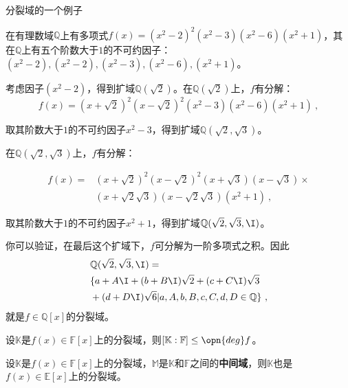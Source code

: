 \begin{example}{分裂域的一个例子}


在有理数域$\mathbb{Q}$上有多项式$f(x)=(x^2-2)^2(x^2-3)(x^2-6)(x^2+1)$，其在$\mathbb{Q}$上有五个阶数大于$1$的不可约因子：$(x^2-2), (x^2-2), (x^2-3), (x^2-6), (x^2+1)$。

考虑因子$(x^2-2)$，得到扩域$\mathbb{Q}(\sqrt{2})$。在$\mathbb{Q}(\sqrt{2})$上，$f$有分解：
\begin{equation}
f(x)=(x+\sqrt{2})^2(x-\sqrt{2})^2(x^2-3)(x^2-6)(x^2+1)~,
\end{equation}

取其阶数大于$1$的不可约因子$x^2-3$，得到扩域$\mathbb{Q}(\sqrt{2}, \sqrt{3})$。

在$\mathbb{Q}(\sqrt{2}, \sqrt{3})$上，$f$有分解：

\begin{equation}
\begin{aligned}
f(x)=&(x+\sqrt{2})^2(x-\sqrt{2})^2(x+\sqrt{3})(x-\sqrt{3})\times\\
&(x+\sqrt{2}\sqrt{3})(x-\sqrt{2}\sqrt{3})(x^2+1)~,
\end{aligned}
\end{equation}

取其阶数大于$1$的不可约因子$x^2+1$，得到扩域$\mathbb{Q}(\sqrt{2}, \sqrt{3}, \I)$。

你可以验证，在最后这个扩域下，$f$可分解为一阶多项式之积。因此
\begin{equation}
\begin{aligned}
&\mathbb{Q}(\sqrt{2}, \sqrt{3}, \I)=\\
&\{a+A\I+(b+B\I)\sqrt{2}+(c+C\I)\sqrt{3}\\
&+(d+D\I)\sqrt{6} | a, A, b, B, c, C, d, D\in\mathbb{Q}\}~,
\end{aligned}
\end{equation}
就是$f\in\mathbb{Q}[x]$的分裂域。

\end{example}

\begin{corollary}{}
设$\mathbb{K}$是$f(x)\in \mathbb{F}[x]$上的分裂域，则$[\mathbb{K}:\mathbb{F}]\leq \opn{deg}f$。
\end{corollary}

\begin{corollary}{}
设$\mathbb{K}$是$f(x)\in \mathbb{F}[x]$上的分裂域，$\mathbb{M}$是$\mathbb{K}$和$\mathbb{F}$之间的\textbf{中间域}，则$\mathbb{K}$也是$f(x)\in \mathbb{E}[x]$上的分裂域。

\end{corollary}


